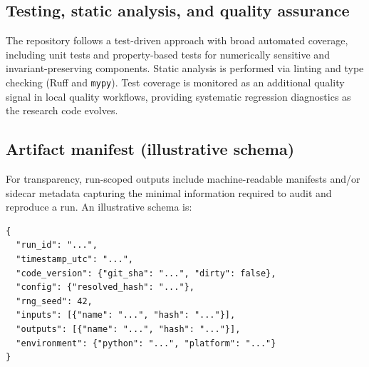 \documentclass[11pt,a4paper]{article}
\begin{document}
\subsection*{Testing, static analysis, and quality assurance}
The repository follows a test-driven approach with broad automated coverage,
including unit tests and property-based tests for numerically sensitive and
invariant-preserving components. Static analysis is performed via linting and
type checking (Ruff and \texttt{mypy}). Test coverage is monitored as an
additional quality signal in local quality workflows, providing systematic
regression diagnostics as the research code evolves.

\subsection*{Artifact manifest (illustrative schema)}
For transparency, run-scoped outputs include machine-readable manifests and/or
sidecar metadata capturing the minimal information required to audit and
reproduce a run. An illustrative schema is:

\begin{verbatim}
{
  "run_id": "...",
  "timestamp_utc": "...",
  "code_version": {"git_sha": "...", "dirty": false},
  "config": {"resolved_hash": "..."},
  "rng_seed": 42,
  "inputs": [{"name": "...", "hash": "..."}],
  "outputs": [{"name": "...", "hash": "..."}],
  "environment": {"python": "...", "platform": "..."}
}
\end{verbatim}
\end{document}
